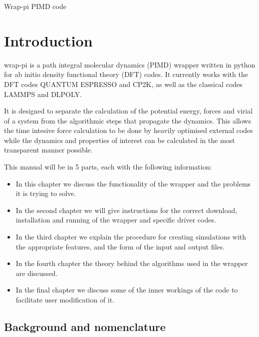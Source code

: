 \documentclass[12pt,fleqn]{report}
\begin{document}
\begin{titlepage}
\begin{center}

\vspace*{+5.5cm}

{\LARGE Wrap-pi PIMD code}
\end{center}
\end{titlepage}


\tableofcontents
\listoffigures

\newpage
{}

\chapter{Introduction}
wrap-pi is a path integral molecular dynamics (PIMD) wrapper written in python 
for ab initio density functional theory (DFT) codes. It currently works with 
the DFT codes QUANTUM ESPRESSO and CP2K, as well as the classical codes 
LAMMPS and DLPOLY.

It is designed to separate the calculation of the potential energy, forces and 
virial of a system from the algorithmic steps that propagate the dynamics. 
This allows the time intesive force calculation to be done by heavily optimised 
external codes while the dynamics and properties of interest can be calculated 
in the most transparent manner possible.

This manual will be in 5 parts, each with the following information:
\begin{itemize}
\item In this chapter we discuss the functionality of the wrapper and the 
problems it is trying to solve.
\item In the second chapter we will give instructions for the correct download, 
installation and running of the wrapper and specific driver codes.
\item In the third chapter we explain the procedure for creating simulations 
with the appropriate features, and the form of the input and output files.
\item In the fourth chapter the theory behind the algorithms used in the 
wrapper are discussed.
\item In the final chapter we discuss some of the inner workings of the code to 
facilitate user modification of it.
\end{itemize}
\section{Background and nomenclature}
\end{document}

